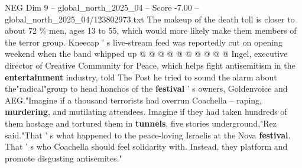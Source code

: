 \begin{textsample}{NEG Dim 9 – global\_north\_2025\_04 – Score -7.00 – global\_north\_2025\_04/123802973.txt}
The makeup of the death toll is closer to about 72 \% men, ages 13 to 55, which would more likely make them members of the terror group.
Kneecap ' s live-stream feed was reportedly cut on opening weekend when the band whipped up @ @ @ @ @ @ @ @ @ @ Ingel, executive director of Creative Community for Peace, which helps fight antisemitism in the \textbf{entertainment} industry, told The Post he tried to sound the alarm about the"radical"group to head honchos of the \textbf{festival} ' s owners, Goldenvoice and AEG."Imagine if a thousand terrorists had overrun Coachella -- raping, \textbf{murdering}, and mutilating attendees.
Imagine if they had taken hundreds of them hostage and tortured them in \textbf{tunnels}, five stories underground,"Rez said."That ' s what happened to the peace-loving Israelis at the Nova \textbf{festival}.
That ' s who Coachella should feel solidarity with.
Instead, they platform and promote disgusting antisemites."

\end{textsample}
